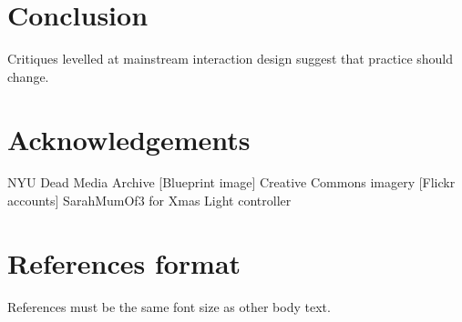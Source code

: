 \documentclass{chi-ext}
\begin{document}

\section{Conclusion}

Critiques levelled at mainstream interaction design suggest that practice should change.

\section{Acknowledgements}
NYU Dead Media Archive [Blueprint image]
Creative Commons imagery [Flickr accounts]
SarahMumOf3 for Xmas Light controller


\section{References format}
References must be the same font size as other body text.

\balance


\end{document}
